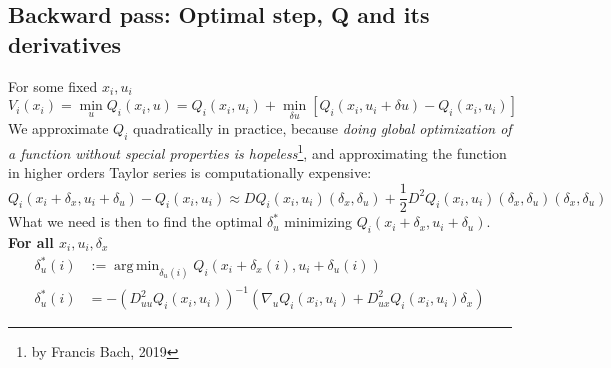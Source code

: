 \documentclass{report}
\DeclareMathOperator*{\argmin}{arg\,min}
\begin{document}
\subsection{Backward pass: Optimal step, Q and its derivatives}
%
%
%
%

For some fixed $x_i,u_i$
\begin{equation}
\label{eq:V}
V_i(x_i) = \min_u Q_i(x_i,u) = Q_i(x_i, u_i) + \min_{\delta u} [Q_i(x_i,u_i + \delta u) - Q_i(x_i,u_i)] 
\end{equation}
We approximate $Q_i$ quadratically in practice, because \emph{doing global optimization of a function without special properties is hopeless}\footnote{by Francis Bach, 2019}, and approximating the function in higher orders Taylor series is computationally expensive: 
\begin{equation}
\label{Q approx}
Q_i(x_i + \delta_x, u_i + \delta_u )- Q_i(x_i,u_i)\approx DQ_i(x_i,u_i)(\delta_x, \delta_u) + \frac{1}{2}D^2 Q_i (x_i,u_i) (\delta_x, \delta_u)(\delta_x, \delta_u)
\end{equation}
What we need is then to find the optimal $\delta_u^*$ minimizing $Q_i(x_i + \delta_x, u_i + \delta_u )$. \textbf{For all $x_i,u_i, \delta_x$} 
\begin{equation}
\begin{split}
\delta_u^* (i) &:= \argmin_{\delta_u(i)}Q_i(x_i + \delta_x(i), u_i + \delta_u(i) ) \\
\delta_u^* (i)&= -(D^2_{uu}Q_i(x_i, u_i))^{-1} (\nabla_u Q_i(x_i,u_i) + D^2_{ux} Q_i(x_i,u_i) \delta_x)
\end{split}
\end{equation}
\end{document}
